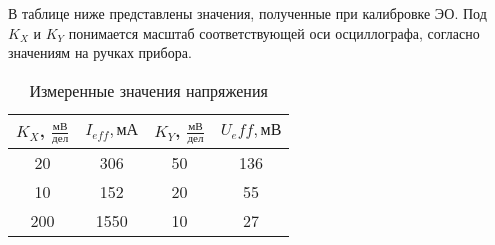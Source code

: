 \documentclass[12pt, letterpaper, oneside]{article}
\begin{document}
В таблице ниже представлены значения, полученные при калибровке ЭО. Под $K_X$ и $K_Y$ понимается масштаб соответствующей оси осциллографа, согласно значениям на ручках прибора.
\begin{table}[H]
\centering
\caption{Измеренные значения напряжения}
\begin{tabular}{|c|c||c|c|}
\hline
$K_X$, $\frac{мВ}{дел}$ & $I_{eff}, мА$ & $K_Y$, $\frac{мВ}{дел}$ & $U_eff, мВ$\\
\hline
20 & 306 & 50 & 136\\
\hline
10 & 152 & 20 & 55\\
\hline
200 & 1550 & 10 & 27\\
\hline
\end{tabular}
\end{table}
\end{document}
